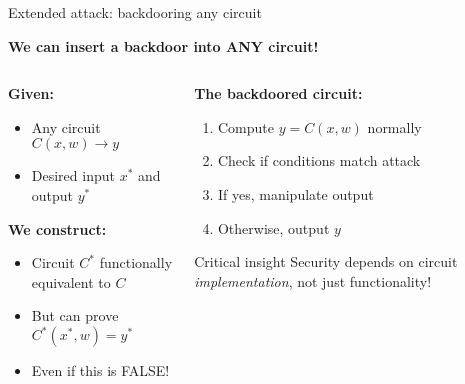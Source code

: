 \documentclass[aspectratio=169, lualatex, handout]{beamer}
\begin{document}
\begin{frame}{Extended attack: backdooring any circuit}
	\begin{center}
		\textbf{We can insert a backdoor into ANY circuit!}
	\end{center}
	\vspace{0.5em}
	\begin{columns}[c]
		\begin{column}{0.5\textwidth}
			\textbf{Given:}
			\begin{itemize}
				\item Any circuit $C(x,w) \rightarrow y$
				\item Desired input $x^*$ and output $y^*$
			\end{itemize}
			\vspace{0.5em}
			\textbf{We construct:}
			\begin{itemize}
				\item Circuit $C^*$ functionally equivalent to $C$
				\item But can prove $C^*(x^*, w) = y^*$
				\item Even if this is FALSE!
			\end{itemize}
		\end{column}
		\begin{column}{0.5\textwidth}
			\textbf{The backdoored circuit:}
			\begin{enumerate}
				\item Compute $y = C(x,w)$ normally
				\item Check if conditions match attack
				\item If yes, manipulate output
				\item Otherwise, output $y$
			\end{enumerate}
			\vspace{0.5em}
			\begin{alertblock}{Critical insight}
				Security depends on circuit \textit{implementation}, not just functionality!
			\end{alertblock}
		\end{column}
	\end{columns}
\end{frame}
\end{document}
